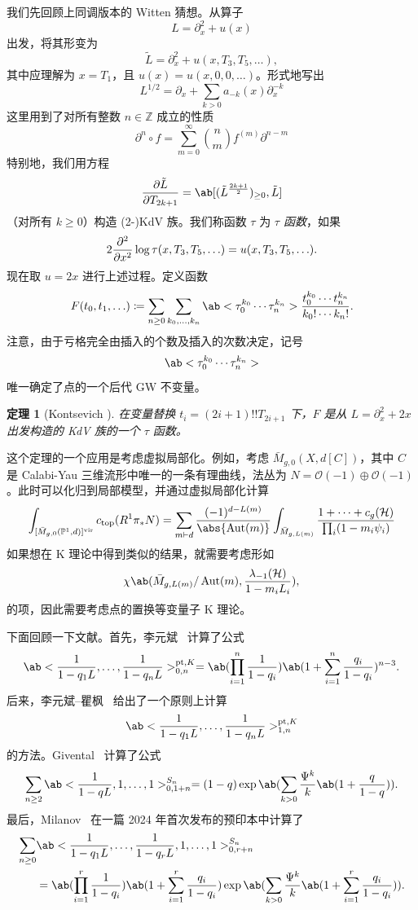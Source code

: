 \documentclass{amsart}
\newtheorem{thm}{定理}[section]
\theoremstyle{definition}
\theoremstyle{remark}
\theoremstyle{plain}
\theoremstyle{definition}
\theoremstyle{remark}
\newcommand{\Z}{\mathbb{Z}}
\renewcommand{\P}{\mathbb{P}}
\newcommand{\mc}[1]{\mathcal{#1}}
\newcommand{\mr}[1]{\mathrm{#1}}
\newcommand{\1}{\mathbf{1}}
\newcommand{\2}{\mathbf{2}}
\newcommand{\3}{\mathbf{3}}
\newcommand{\vir}{\mr{vir}}
\DeclareMathOperator{\Aut}{Aut}
\begin{document}
我们先回顾上同调版本的 Witten 猜想。从算子
\[ L = \partial_x^2 + u(x) \]
出发，将其形变为
\[ \tilde{L} = \partial_x^2 + u(x, T_3, T_5, \ldots), \]
其中应理解为 \(x = T_1\)，且 \(u(x) = u(x, 0, 0,\ldots)\)。形式地写出
\[ L^{1/2} = \partial_x + \sum_{k > 0} a_{-k}(x) \partial_x^{-k} \]
这里用到了对所有整数 \(n \in \Z\) 成立的性质
\[ \partial^n \circ f = \sum_{m = 0}^{\infty} \binom{n}{m} f^{(m)} \partial^{n-m} \]
特别地，我们用方程
\[ \pdv{\tilde{L}}{T_{2k+1}} = \ab[(\tilde{L}^{\frac{2k+1}{2}})_{\geq 0}, \tilde{L}] \]
（对所有 \(k \geq 0\)）构造 (2-)KdV 族。我们称函数 \(\tau\) 为 \textit{\(\tau\) 函数}，如果
\[ 2 \pdv[2]{}{x}\log \tau(x, T_3, T_5, \ldots) = u(x, T_3, T_5, \ldots). \]
现在取 \(u = 2x\) 进行上述过程。定义函数
\[ F(t_0, t_1, \ldots) \coloneqq \sum_{n \geq 0} \sum_{k_0, \ldots, k_n} \ab<\tau_0^{k_0} \cdots \tau_n^{k_n}> \frac{t_0^{k_0} \cdots t_n^{k_n}}{k_0! \cdots k_n!}. \]
注意，由于亏格完全由插入的个数及插入的次数决定，记号
\[ \ab<\tau_0^{k_0} \cdots \tau_n^{k_n}> \]
唯一确定了点的一个后代 GW 不变量。

\begin{thm}[Kontsevich {\cite{Kontsevich1992}}]
    在变量替换 \(t_i = (2i+1)!! T_{2i+1}\) 下，\(F\) 是从 \(L = \partial_x^2 + 2x\) 出发构造的 KdV 族的一个 \(\tau\) 函数。
\end{thm}

这个定理的一个应用是考虑虚拟局部化。例如，考虑 \(\bar{M}_{g,0}(X, d[C])\)，其中 \(C\) 是 Calabi-Yau 三维流形中唯一的一条有理曲线，法丛为 \(N = \mc{O}(-1)\oplus \mc{O}(-1)\)。此时可以化归到局部模型，并通过虚拟局部化计算
\begin{align*}
    \int_{[\bar{M}_{g,0}(\P^1, d)]^{\vir}} c_{\mr{top}}(R^1 \pi_* N) = \sum_{m \vdash d} \frac{(-1)^{d-L(m)}}{\abs{\Aut(m)}} \int_{\bar{M}_{g, L(m)}} \frac{1 + \cdots + c_g(\mc{H})}{\prod_i (1-m_i \psi_i)}
\end{align*}
如果想在 K 理论中得到类似的结果，就需要考虑形如
\[ \chi\ab(\bar{M}_{g, L(m)}/\Aut(m), \frac{\lambda_{-1}(\mc{H})}{1-m_i L_i}), \]
的项，因此需要考虑点的置换等变量子 K 理论。

下面回顾一下文献。首先，李元斌~\cite{Lee1997} 计算了公式
\[ \ab<\frac{1}{1-q_1 L}, \ldots, \frac{1}{1-q_n L}>_{0,n}^{\mr{pt}, K} = \ab(\prod_{i=1}^n \frac{1}{1-q_i}) \ab(1 + \sum_{i=1}^n \frac{q_i}{1-q_i})^{n-3}. \]
后来，李元斌--瞿枫~\cite{LeeQu2014} 给出了一个原则上计算
\[ \ab<\frac{1}{1-q_1 L}, \ldots, \frac{1}{1-q_n L}>_{1,n}^{\mr{pt}, K} \]
的方法。Givental~\cite{Givental2017K1} 计算了公式
\[ \sum_{n \geq 2} \ab<\frac{1}{1-q L}, 1, \ldots, 1>_{0,1+n}^{S_n} = (1-q) \exp\ab(\sum_{k > 0} \frac{\Psi^k}{k} \ab(1 + \frac{q}{1-q})). \]
最后，Milanov~\cite{Milanov2025} 在一篇 2024 年首次发布的预印本中计算了
\begin{align*}
    \sum_{n \geq 0}& \ab<\frac{1}{1-q_1 L}, \ldots, \frac{1}{1-q_r L}, 1, \ldots, 1>_{0,r+n}^{S_n} \\
    &= \ab(\prod_{i=1}^{r} \frac{1}{1-q_i})\ab(1 + \sum_{i=1}^r \frac{q_i}{1-q_i}) \exp\ab(\sum_{k > 0} \frac{\Psi^k}{k} \ab(1 + \sum_{i=1}^r \frac{q_i}{1-q_i})).
\end{align*}
\end{document}
